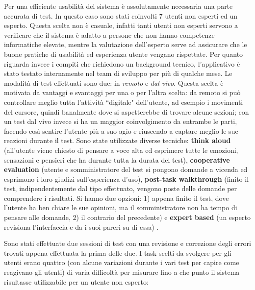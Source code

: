 \documentclass[a4paper,10pt]{memoir}
\begin{document}
Per una efficiente usabilità del sistema è assolutamente necessaria una parte accurata di test.
In questo caso sono stati coinvolti 7 utenti non esperti ed un esperto.
Questa scelta non è casuale, infatti tanti utenti non esperti servono a verificare che il sistema è adatto a persone che non hanno competenze informatiche elevate, mentre la valutazione dell'esperto serve ad assicurare che le buone pratiche di usabilità ed esperienza utente vengano rispettate.
Per quanto riguarda invece i compiti che richiedono un background tecnico, l'applicativo è stato testato internamente nel team di sviluppo per più di qualche mese.
Le modalità di test effettuati sono due: in \textit{remoto} e \textit{dal vivo}. Questa scelta è motivata da vantaggi e svantaggi per una o per l'altra scelta: da remoto si può controllare meglio tutta l'attività ``digitale" dell'utente, ad esempio i movimenti del cursore, quindi banalmente dove si aspetterebbe di trovare alcune sezioni; con un test dal vivo invece si ha un maggior coinvolgimento da entrambe le parti, facendo così sentire l'utente più a suo agio e riuscendo a captare meglio le sue reazioni durante il test.
Sono state utilizzate diverse tecniche: \textbf{think aloud} (all'utente viene chiesto di pensare a voce alta ed esprimere tutte le emozioni, sensazioni e pensieri che ha durante tutta la durata del test), \textbf{cooperative evaluation} (utente e somministratore del test si pongono domande a vicenda ed esprimono i loro giudizi sull'esperienza d'uso), \textbf{post-task walkthrough} (finito il test, indipendentemente dal tipo effettuato, vengono poste delle domande per comprendere i risultati. Si hanno due opzioni: 1) appena finito il test, dove l'utente ha ben chiare le sue opinioni, ma il somministratore non ha tempo di pensare alle domande, 2) il contrario del precedente) e \textbf{expert based} (un esperto revisiona l'interfaccia e da i suoi pareri su di essa) \cite{hcibook}.

Sono stati effettuate due sessioni di test con una revisione e correzione degli errori trovati appena effettuata la prima delle due.
I task scelti da svolgere per gli utenti erano quattro (con alcune variazioni durante i vari test per capire come reagivano gli utenti) di varia difficoltà per misurare fino a che punto il sistema risultasse utilizzabile per un utente non esperto:
\end{document}
